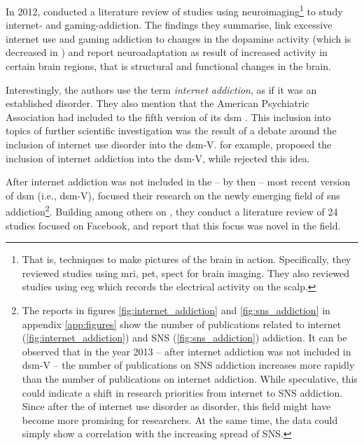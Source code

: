 In 2012, \citet{kuss_internet_2012} conducted a literature review of studies using  neuroimaging\footnote{That is, techniques to make pictures of the brain in action. 
Specifically, they reviewed studies using \gls{mri}, \gls{pet}, \gls{spect} for brain imaging. 
They also reviewed studies using \gls{eeg} which records the electrical activity on the scalp.} to study internet- and gaming-addiction.
The findings they summarise, link excessive internet use and gaming addiction to changes in the dopamine activity (which is decreased in ) and report neuroadaptation as result of increased activity in certain brain regions, that is structural and functional changes in the brain.

Interestingly, the authors use the term \textit{internet addiction}, as if it was an established disorder. 
They also mention that the American Psychiatric Association had included  \citep{kuss_internet_2012} to the fifth version of its \gls{dsm} \citep{american_psychiatric_association_diagnostic_2013}.
This inclusion into topics of further scientific investigation was the result of a debate around the inclusion of internet use disorder into the \gls{dsm}-V.
\citet{block_issues_2008} for example, proposed the inclusion of internet addiction into the \gls{dsm}-V, while \citet{weinstein_internet_2010} rejected this idea. 

After internet addiction was not included in the -- by then -- most recent version of \gls{dsm} (i.e., \gls{dsm}-V), \citet{ryan_uses_2014} focused their research on the newly emerging field of \gls{sns} addiction\footnote{The reports in figures \ref{fig:internet_addiction} and \ref{fig:sns_addiction} in appendix \ref{app:figures} show the number of publications related to internet (\ref{fig:internet_addiction}) and SNS (\ref{fig:sns_addiction}) addiction. It can be observed that in the year 2013 -- after internet addiction was not included in \gls{dsm}-V -- the number of publications on SNS addiction increases more rapidly than the number of publications on internet addiction. While speculative, this could indicate a shift in research priorities from internet to SNS addiction. Since after the   of internet use disorder as  disorder, this field might have become more promising for researchers. At the same time, the data could simply show a correlation with the increasing spread of SNS.}.
Building among others on \citep{kuss_online_2011, kuss_internet_2014}, they conduct a literature review of 24 studies focused on Facebook, and report that this focus was novel in the field.

